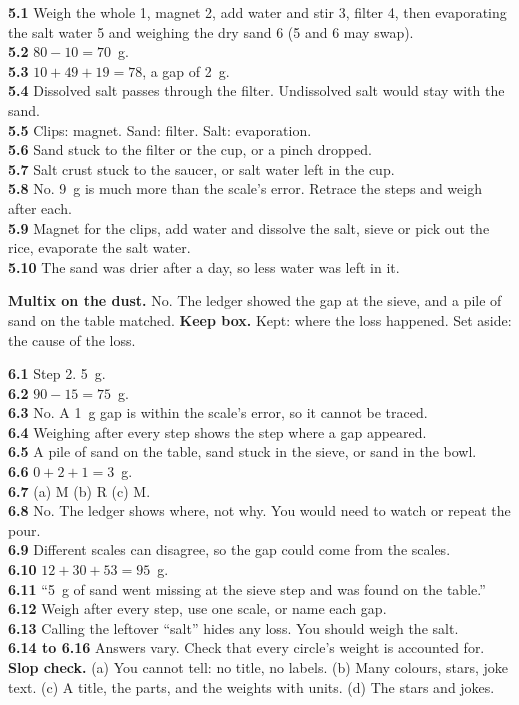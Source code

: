 \textbf{5.1} Weigh the whole 1, magnet 2, add water and stir 3, filter 4, then evaporating the salt water 5 and weighing the dry sand 6 (5 and 6 may swap).\\
\textbf{5.2} $80-10=70$~g.\\
\textbf{5.3} $10+49+19=78$, a gap of 2~g.\\
\textbf{5.4} Dissolved salt passes through the filter. Undissolved salt would stay with the sand.\\
\textbf{5.5} Clips: magnet. Sand: filter. Salt: evaporation.\\
\textbf{5.6} Sand stuck to the filter or the cup, or a pinch dropped.\\
\textbf{5.7} Salt crust stuck to the saucer, or salt water left in the cup.\\
\textbf{5.8} No. 9~g is much more than the scale's error. Retrace the steps and weigh after each.\\
\textbf{5.9} Magnet for the clips, add water and dissolve the salt, sieve or pick out the rice, evaporate the salt water.\\
\textbf{5.10} The sand was drier after a day, so less water was left in it.

\textbf{Multix on the dust.} No. The ledger showed the gap at the sieve, and a pile of sand on the table matched. \textbf{Keep box.} Kept: where the loss happened. Set aside: the cause of the loss.

\textbf{6.1} Step 2. 5~g.\\
\textbf{6.2} $90-15=75$~g.\\
\textbf{6.3} No. A 1~g gap is within the scale's error, so it cannot be traced.\\
\textbf{6.4} Weighing after every step shows the step where a gap appeared.\\
\textbf{6.5} A pile of sand on the table, sand stuck in the sieve, or sand in the bowl.\\
\textbf{6.6} $0+2+1=3$~g.\\
\textbf{6.7} (a) M (b) R (c) M.\\
\textbf{6.8} No. The ledger shows where, not why. You would need to watch or repeat the pour.\\
\textbf{6.9} Different scales can disagree, so the gap could come from the scales.\\
\textbf{6.10} $12+30+53=95$~g.\\
\textbf{6.11} ``5~g of sand went missing at the sieve step and was found on the table.''\\
\textbf{6.12} Weigh after every step, use one scale, or name each gap.\\
\textbf{6.13} Calling the leftover ``salt'' hides any loss. You should weigh the salt.\\
\textbf{6.14 to 6.16} Answers vary. Check that every circle's weight is accounted for.\\
\textbf{Slop check.} (a) You cannot tell: no title, no labels. (b) Many colours, stars, joke text. (c) A title, the parts, and the weights with units. (d) The stars and jokes.

